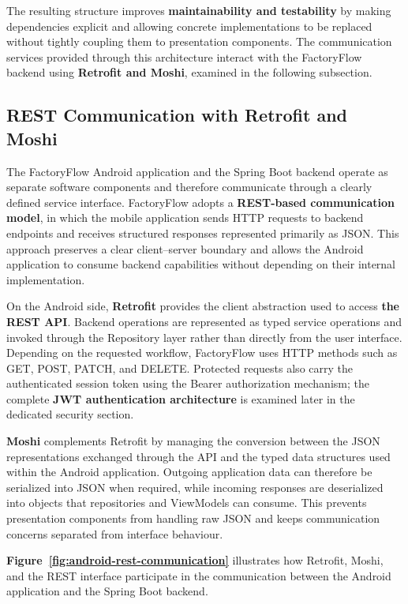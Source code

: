 The resulting structure improves \textbf{maintainability and testability} by making dependencies explicit and allowing concrete implementations to be replaced without tightly coupling them to presentation components. The communication services provided through this architecture interact with the FactoryFlow backend using \textbf{Retrofit and Moshi}, examined in the following subsection.

\subsection{REST Communication with Retrofit and Moshi}
\label{subsec:android-retrofit-moshi}

The FactoryFlow Android application and the Spring Boot backend operate as separate software components and therefore communicate through a clearly defined service interface. FactoryFlow adopts a \textbf{REST-based communication model}, in which the mobile application sends HTTP requests to backend endpoints and receives structured responses represented primarily as JSON. This approach preserves a clear client--server boundary and allows the Android application to consume backend capabilities without depending on their internal implementation.

On the Android side, \textbf{Retrofit} provides the client abstraction used to access \textbf{the REST API}. Backend operations are represented as typed service operations and invoked through the Repository layer rather than directly from the user interface. Depending on the requested workflow, FactoryFlow uses HTTP methods such as GET, POST, PATCH, and DELETE. Protected requests also carry the authenticated session token using the Bearer authorization mechanism; the complete \textbf{JWT authentication architecture} is examined later in the dedicated security section.

\textbf{Moshi} complements Retrofit by managing the conversion between the JSON representations exchanged through the API and the typed data structures used within the Android application. Outgoing application data can therefore be serialized into JSON when required, while incoming responses are deserialized into objects that repositories and ViewModels can consume. This prevents presentation components from handling raw JSON and keeps communication concerns separated from interface behaviour.

\textbf{Figure~\ref{fig:android-rest-communication}} illustrates how Retrofit, Moshi, and the REST interface participate in the communication between the Android application and the Spring Boot backend.

